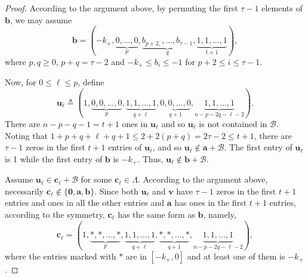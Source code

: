 \documentclass[sort&compress]{elsarticle}
\newcommand{\cB}{\mathcal{B}}
\renewcommand{\leq}{\leqslant}
\renewcommand{\geq}{\geqslant}
\newcommand{\vv}{\mathbf{v}}
\newcommand{\vu}{\mathbf{u}}
\newcommand{\va}{\mathbf{a}}
\newcommand{\vb}{\mathbf{b}}
\newcommand{\vc}{\mathbf{c}}
\newcommand{\Zero}{{\mathbf{0}}}
\newcommand{\kp}{k_+}
\newcommand{\eqdef}{\triangleq}
\begin{document}
\begin{proof}
  According to the argument above, by permuting the first $\tau-1$
  elements of $\vb$, we may assume
  \[ \vb=(-\kp,\underbrace{0,\ldots,0}_p,  \underbrace{b_{p+2,},\ldots, b_{\tau-1}}_{q}, \underbrace{1,1,\ldots,1}_{t+1}),\]
  where $p,q\geq 0$, $p+q=\tau-2$ and $-\kp\leq b_i \leq -1$ for $p+2
  \leq i\leq \tau-1$.

  Now, for $0\leq \ell \leq p$, define
  \[\vu_\ell \eqdef(1,\underbrace{0,0,\ldots,0}_p,\underbrace{1,1,\ldots,1}_{q+ \ell}, \underbrace{0,0,\ldots,0}_{q+1}, \underbrace{1,1,\ldots,1}_{n-p-2q-\ell-2}). \]
  There are $n-p-q-1=t+1$ ones in $\vu_\ell$ and so $\vu_\ell$ is not
  contained in $\cB$. Noting that $1+p+q+\ell+q+1 \leq
  2+2(p+q)=2\tau-2\leq t+1$, there are $\tau-1$ zeros in the first
  $t+1$ entries of $\vu_\ell$, and so $\vu_\ell\not\in \va+\cB$.  The
  first entry of $\vu_\ell$ is 1 while the first entry of $\vb$ is
  $-\kp$. Thus, $\vu_\ell\not\in \vb+\cB$.

  Assume $\vu_\ell\in \vc_\ell+\cB$ for some $\vc_\ell\in
  \Lambda$. According to the argument above, necessarily $\vc_\ell
  \not \in \{\Zero, \va,\vb\}$. Since both $\vu_\ell$ and $\vv$ have
  $\tau-1$ zeros in the first $t+1$ entries and ones in all the other
  entries and $\va$ has ones in the first $t+1$ entries, according to
  the symmetry, $\vc_\ell$ has the same form as $\vb$, namely,
  \[\vc_\ell =(1,\underbrace{*,*,\ldots,*}_p,\underbrace{1,1,\ldots,1}_{q+ \ell}, \underbrace{*,*,\ldots,*}_{q+1}, \underbrace{1,1,\ldots,1}_{n-p-2q-\ell-2}),\]
  where the entries marked with $*$ are in $[-\kp,0]$ and at least one
  of them is $-\kp$.


\end{proof}
\end{document}
